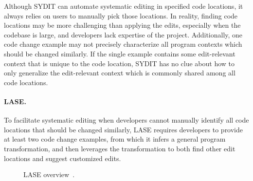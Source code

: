 Although SYDIT can automate systematic editing in specified code locations, it always relies on users to manually pick those locations. In reality, finding code locations may be more challenging than applying the edits, especially when the codebase is large, and developers lack expertise of the project. Additionally, one code change example may not precisely characterize all program contexts which should be changed similarly. If the single example contains some edit-relevant context that is unique to the code location, SYDIT has no clue about how to only generalize the edit-relevant context which is commonly shared among all code locations.


\paragraph{LASE.} To facilitate systematic editing when developers cannot manually identify all code locations that should be changed similarly, LASE requires developers to provide at least two code change examples, from which it infers a general program transformation, and then leverages the transformation to both find other edit locations and suggest customized edits. 

\begin{figure}
\centering
{}
\caption{LASE overview~\cite{MKM2013}.}
\label{fig:laseoverview}
\end{figure}

